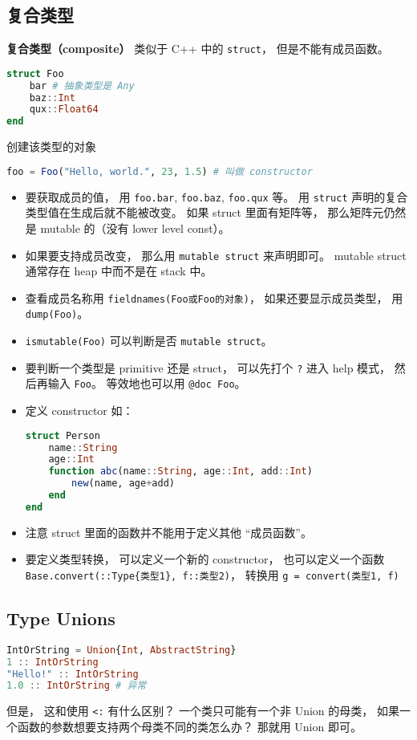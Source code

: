 \subsection{复合类型}
\textbf{复合类型（composite）} 类似于 C++ 中的 \verb`struct`， 但是不能有成员函数。
\begin{lstlisting}[language=julia]
struct Foo
    bar # 抽象类型是 Any
    baz::Int
    qux::Float64
end
\end{lstlisting}
创建该类型的对象
\begin{lstlisting}[language=julia]
foo = Foo("Hello, world.", 23, 1.5) # 叫做 constructor
\end{lstlisting}
\begin{itemize}
\item 要获取成员的值， 用 \verb`foo.bar`, \verb`foo.baz`, \verb`foo.qux` 等。 用 \verb`struct` 声明的复合类型值在生成后就不能被改变。 如果 struct 里面有矩阵等， 那么矩阵元仍然是 mutable 的（没有 lower level const）。
\item 如果要支持成员改变， 那么用 \verb`mutable struct` 来声明即可。 mutable struct 通常存在 heap 中而不是在 stack 中。
\item 查看成员名称用 \verb`fieldnames(Foo或Foo的对象)`， 如果还要显示成员类型， 用 \verb`dump(Foo)`。
\item \verb`ismutable(Foo)` 可以判断是否 \verb`mutable struct`。
\item 要判断一个类型是 primitive 还是 struct， 可以先打个 \verb`?` 进入 help 模式， 然后再输入 \verb`Foo`。 等效地也可以用 \verb`@doc Foo`。
\item 定义 constructor 如：
\begin{lstlisting}[language=julia]
struct Person
    name::String
    age::Int
    function abc(name::String, age::Int, add::Int)
        new(name, age+add)
    end
end
\end{lstlisting}
\item 注意 struct 里面的函数并不能用于定义其他 “成员函数”。
\item 要定义类型转换， 可以定义一个新的 constructor， 也可以定义一个函数 \verb`Base.convert(::Type{类型1}, f::类型2)`， 转换用 \verb`g = convert(类型1, f)`
\end{itemize}

\subsection{Type Unions}
\begin{lstlisting}[language=julia]
IntOrString = Union{Int, AbstractString}
1 :: IntOrString
"Hello!" :: IntOrString
1.0 :: IntOrString # 异常
\end{lstlisting}
但是， 这和使用 \verb`<:` 有什么区别？ 一个类只可能有一个非 Union 的母类， 如果一个函数的参数想要支持两个母类不同的类怎么办？ 那就用 Union 即可。

